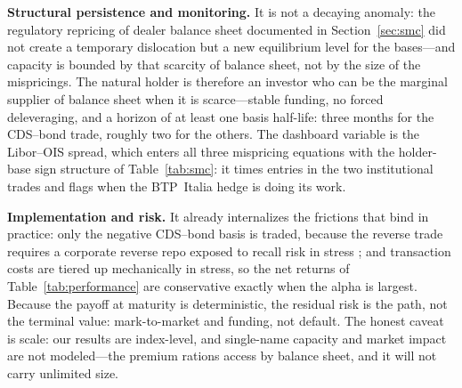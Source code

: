 \textbf{Structural persistence and monitoring.} It
is not a decaying anomaly: the regulatory repricing of dealer balance sheet documented
in Section~\ref{sec:smc} did not create a temporary dislocation but a new
equilibrium level for the bases---and capacity is bounded by that scarcity of
balance sheet, not by the size of the mispricings.
The natural holder is therefore an investor who can be the marginal supplier
of balance sheet when it is scarce---stable funding, no forced deleveraging,
and a horizon of at least one basis half-life: three months for the CDS--bond
trade, roughly two for the others. The dashboard variable is the Libor--OIS
spread, which enters all three mispricing equations with the holder-base sign
structure of Table~\ref{tab:smc}: it times entries in the two institutional
trades and flags when the BTP~Italia hedge is doing its work.

\textbf{Implementation and risk.} It already internalizes the frictions
that bind in practice: only the negative CDS--bond basis is traded, because
the reverse trade requires a corporate reverse repo exposed to recall risk in
stress \citep{bai2019cds}; and transaction costs are tiered up mechanically in
stress, so the net returns of Table~\ref{tab:performance} are conservative
exactly when the alpha is largest. Because the payoff at maturity is deterministic,
the residual risk is the path, not the terminal value: mark-to-market and
funding, not default.
The honest caveat is scale: our results are index-level, and single-name
capacity and market impact are not modeled---the premium rations access by
balance sheet, and it will not carry unlimited size.